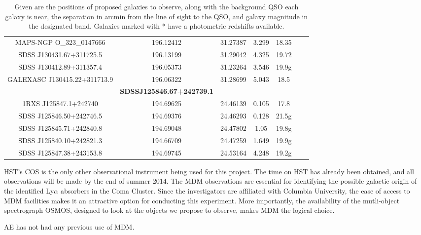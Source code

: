 \begin{table}
\begin{tabular}{ c c c c c c c }
MAPS-NGP O\_323\_0147666 & 196.12412 & 31.27387 & 3.299 & 18.35\\
SDSS J130431.67+311725.5 & 196.13199 & 31.29042 & 4.325 & 19.72\\
SDSS J130412.89+311357.4 & 196.05373 & 31.23264 & 3.546 & 19.9g\\
GALEXASC J130415.22+311713.9 & 196.06322 & 31.28699 & 5.043 & 18.5\\
\hline
& \textbf{SDSSJ125846.67+242739.1} &&&\\
\hline
1RXS J125847.1+242740 & 194.69625 & 24.46139 & 0.105 & 17.8\\
SDSS J125846.50+242746.5 & 194.69376 & 24.46293 & 0.128 & 21.5g\\
SDSS J125845.71+242840.8 & 194.69048 & 24.47802 & 1.05 & 19.8g\\
SDSS J125840.10+242821.3 & 194.66709 & 24.47259 & 1.649 & 19.9g\\
SDSS J125847.38+243153.8 & 194.69745 & 24.53164 & 4.248 & 19.2g\\
\hline
\end{tabular}
\caption{Given are the positions of proposed galaxies to observe, along with the 
background QSO each galaxy is near, the separation in arcmin from the line of sight
to the QSO, and galaxy magnitude in the designated band. Galaxies marked with *
have a photometric redshifts available.}
\end{table}


%
%

\whymdm
HST's COS is the only other observational instrument being used for this project.
The time on HST has already been obtained, and all observations will be made by
the end of summer 2014. The MDM observations are essential for identifying the
possible galactic origin of the identified Ly$\alpha$ absorbers in the Coma 
Cluster. Since the investigators are affiliated with Columbia University, the ease
of access to MDM facilities makes it an attractive option for conducting this
experiment. More importantly, the availability of the mutli-object spectrograph
OSMOS, designed to look at the objects we propose to observe, makes MDM the 
logical choice.

%

\thepast
AE has not had any previous use of MDM.



